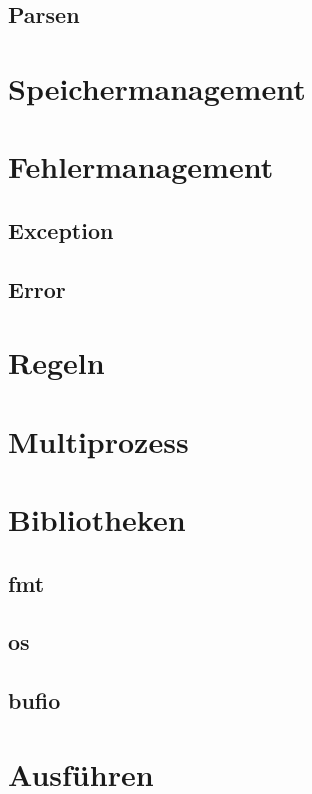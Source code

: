\documentclass[twoside,a4paper,12pt]{article}
\begin{document}
\subsection{Parsen}

\section{Speichermanagement}

\section{Fehlermanagement}
\subsection{Exception}
\subsection{Error}

\section{Regeln}

\section{Multiprozess}

\section{Bibliotheken}
\subsection{fmt}

\subsection{os}

\subsection{bufio}

\section{Ausführen}
\end{document}
